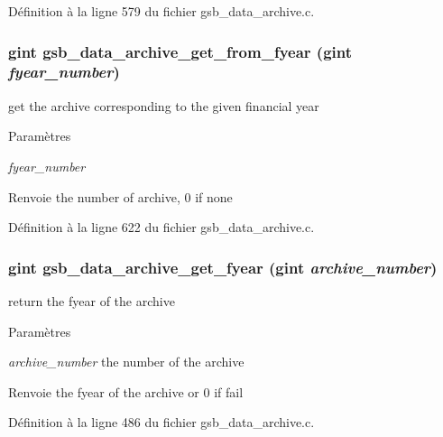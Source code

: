 Définition à la ligne 579 du fichier gsb\_\-data\_\-archive.c.

\subsubsection[{gsb\_\-data\_\-archive\_\-get\_\-from\_\-fyear}]{\setlength{\rightskip}{0pt plus 5cm}gint gsb\_\-data\_\-archive\_\-get\_\-from\_\-fyear (gint {\em fyear\_\-number})}\label{gsb__data__archive_8h_a75a79145c15deb4977a71e7c5ee6db47}
get the archive corresponding to the given financial year


\begin{DoxyParams}{Paramètres}
\item[{\em fyear\_\-number}]\end{DoxyParams}
\begin{DoxyReturn}{Renvoie}
the number of archive, 0 if none 
\end{DoxyReturn}


Définition à la ligne 622 du fichier gsb\_\-data\_\-archive.c.

\subsubsection[{gsb\_\-data\_\-archive\_\-get\_\-fyear}]{\setlength{\rightskip}{0pt plus 5cm}gint gsb\_\-data\_\-archive\_\-get\_\-fyear (gint {\em archive\_\-number})}\label{gsb__data__archive_8h_a7155599a42559d8b97aa24f6c89c3684}
return the fyear of the archive


\begin{DoxyParams}{Paramètres}
\item[{\em archive\_\-number}]the number of the archive\end{DoxyParams}
\begin{DoxyReturn}{Renvoie}
the fyear of the archive or 0 if fail 
\end{DoxyReturn}


Définition à la ligne 486 du fichier gsb\_\-data\_\-archive.c.

